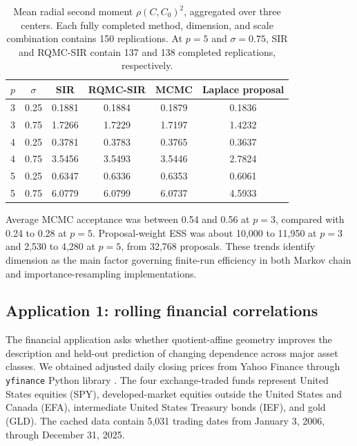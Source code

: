 \documentclass[
  12pt]{article}
\begin{document}
\begin{table}[ht]
\centering
\caption{Mean radial second moment $\rho(C,C_0)^2$, aggregated over three centers. Each fully completed method, dimension, and scale combination contains 150 replications. At $p=5$ and $\sigma=0.75$, SIR and RQMC-SIR contain 137 and 138 completed replications, respectively.}
\label{tab:sim4_radial}
\begin{tabular}{cccccc}
\toprule
$p$ & $\sigma$ & SIR & RQMC-SIR & MCMC & Laplace proposal \\
\midrule
3 & 0.25 & 0.1881 & 0.1884 & 0.1879 & 0.1836 \\
3 & 0.75 & 1.7266 & 1.7229 & 1.7197 & 1.4232 \\
4 & 0.25 & 0.3781 & 0.3783 & 0.3765 & 0.3637 \\
4 & 0.75 & 3.5456 & 3.5493 & 3.5446 & 2.7824 \\
5 & 0.25 & 0.6347 & 0.6336 & 0.6353 & 0.6061 \\
5 & 0.75 & 6.0779 & 6.0799 & 6.0737 & 4.5933 \\
\bottomrule
\end{tabular}
\end{table}

Average MCMC acceptance was between 0.54 and 0.56 at $p=3$, compared with 0.24 to 0.28 at $p=5$. Proposal-weight ESS was about 10,000 to 11,950 at $p=3$ and 2,530 to 4,280 at $p=5$, from 32,768 proposals. These trends identify dimension as the main factor governing finite-run efficiency in both Markov chain and importance-resampling implementations.



\subsection{Application 1: rolling financial correlations}\label{sec:finance_application}

The financial application asks whether quotient-affine geometry improves the description and held-out prediction of changing dependence across major asset classes. We obtained adjusted daily closing prices from Yahoo Finance through \texttt{yfinance} Python library \citep{aroussi_2025_YfinanceDownloadMarket}.  The four exchange-traded funds represent United States equities (SPY), developed-market equities outside the United States and Canada (EFA), intermediate United States Treasury bonds (IEF), and gold (GLD). The cached data contain 5,031 trading dates from January 3, 2006, through December 31, 2025. 
\end{document}
